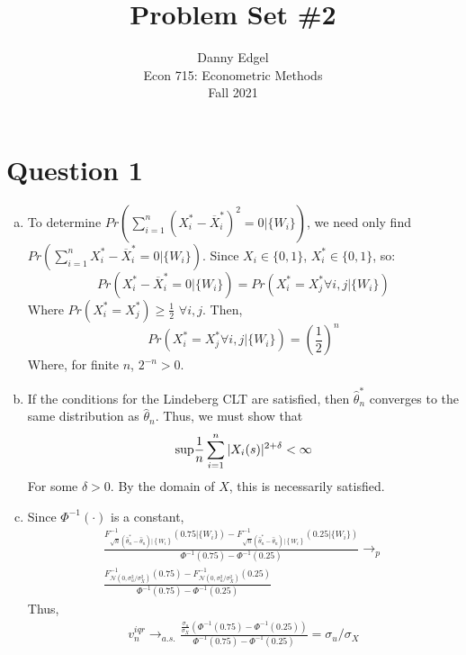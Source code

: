 \documentclass{article}
\newcommand{\N}{\mathcal{N}}
\newcommand{\est}[1]{\frac{1}{\lowercase{#1}}\sum_{i=1}^{\lowercase{#1}}}
\newcommand{\sumn}{\sum_{i=1}^{n}}
\renewcommand{\Pr}[1]{\text{Pr}\left(#1\right)}
\renewcommand{\Pr}[1]{Pr\left(#1\right)}
\newcommand{\that}{\hat{\theta}_n}
\newcommand{\tshat}{\hat{\theta}^*_n}
\newcommand{\xs}{X^*}
\newcommand{\olxs}{\overline{X}^*}
\newcommand{\pinv}{\Phi^{-1}}
\begin{document}
\title{	Problem Set \#2 }
\author{ 	Danny Edgel 					\\ 
			Econ 715: Econometric Methods	\\
			Fall 2021						
		}
\maketitle\thispagestyle{empty}

\section*{Question 1}

\begin{enumerate}[(a)]
    \item To determine ${\Pr{\sumn(\xs_i-\olxs_i)^2=0|\{W_i\}}}$, we need only find \linebreak $\Pr{\sumn\xs_i-\olxs_i=0|\{W_i\}}$. Since ${X_i\in\{0, 1\}}$, ${X_i^*\in\{0, 1\}}$, so:\[
        \Pr{\xs_i-\olxs_i=0|\{W_i\}} = \Pr{\xs_i=\xs_j \forall i,j|\{W_i\}}
    \] Where ${Pr(X^*_i=X_j^*)\geq\frac{1}{2}}$ ${\forall i,j}$. Then, \[
        \Pr{\xs_i=\xs_j \forall i,j|\{W_i\}} = \left(\frac{1}{2}\right)^n
    \]
    Where, for finite $n$, $2^{-n}>0$.

    \item If the conditions for the Lindeberg CLT are satisfied, then $\tshat$ converges to the same distribution as $\that$. Thus, we must show that\[
        \text{sup}\est{n}|X_i(s)|^{2+\delta}<\infty
    \]
    For some $\delta>0$. By the domain of $X$, this is necessarily satisfied.

    \item Since $\pinv(\cdot)$ is a constant,\begin{align*}
        \frac{F^{-1}_{\sqrt{n}(\tshat-\that)|\left\{W_i\right\}}\left(0.75|\{W_i\}\right)-F^{-1}_{\sqrt{n}(\tshat-\that)|\left\{W_i\right\}}\left(0.25|\{W_i\}\right)}{\pinv(0.75) - \pinv(0.25)} \rightarrow_p \\
        \frac{F^{-1}_{\N(0,\sigma_u^2/\sigma_X^2)}\left(0.75\right)-F^{-1}_{\N(0,\sigma_u^2/\sigma_X^2)}\left(0.25\right)}{\pinv(0.75) - \pinv(0.25)}
    \end{align*}
    Thus, \begin{align*}
        v_n^{iqr} \rightarrow_{a.s.} \frac{\frac{\sigma_u}{\sigma_X}\left(\pinv(0.75)-\pinv(0.25)\right)}{\pinv(0.75)-\pinv(0.25)} = \sigma_u/\sigma_X
    \end{align*}


\end{enumerate}
\end{document}
